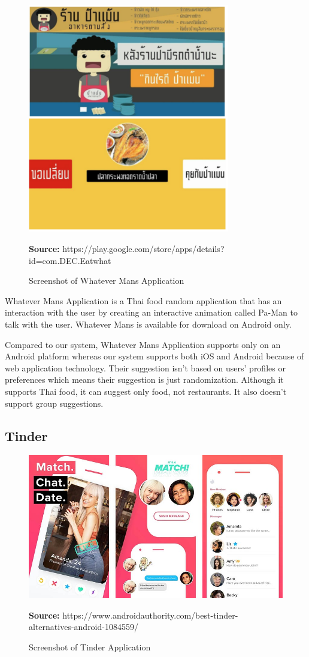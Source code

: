 \documentclass[12pt,oneside,openright,a4paper]{cpe-english-project}
\newcommand*{\captionsource}[2]{%
  \caption[{#1}]{#1}\vspace{-8pt}
  \textbf{Source:} #2}
\begin{document}
\begin{figure}[H]\centering
\includegraphics[width=250pt]{./images/2whatman.png}
\label{fig:2whatman}
\captionsource{Screenshot of Whatever Mans Application}{https://play.google.com/store/apps/details?id=com.DEC.Eatwhat}
\end{figure}

Whatever Mans Application is a Thai food random application that has an interaction with the user by creating an interactive animation called Pa-Man to talk with the user. Whatever Mans is available for download on Android only.

Compared to our system, Whatever Mans Application supports only on an Android platform whereas our system supports both iOS and Android because of web application technology. Their suggestion isn't based on users’ profiles or preferences which means their suggestion is just randomization. Although it supports Thai food, it can suggest only food, not restaurants. It also doesn’t support group suggestions.

\newpage
\subsection{Tinder}

\begin{figure}[H]\centering
\includegraphics[width=400pt]{./images/2tinder.jpeg}
\label{fig:2tinder}
\captionsource{Screenshot of Tinder Application}{https://www.androidauthority.com/best-tinder-alternatives-android-1084559/}
\end{figure}
\end{document}
